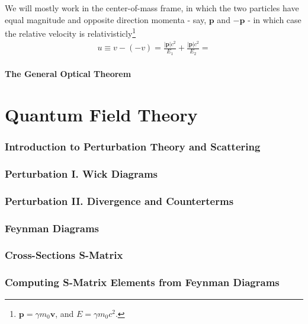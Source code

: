 \documentclass[12pt]{article}
\numberwithin{equation}{section}
\begin{document}
We will mostly work in the center-of-mass frame, in which the two particles have equal magnitude and opposite direction momenta - say, $\mathbf{p}$ and $-\mathbf{p}$ - in which case the relative velocity is relativisticly\footnote{$\mathbf{p} = \gamma m_0\mathbf{v}$, and $E=\gamma m_0c^2$.}
\begin{equation}
    \begin{split}
        u \equiv v-(-v) = \frac{|\mathbf{p}|c^2}{E_1}+\frac{|\mathbf{p}|c^2}{E_2} = 
    \end{split}
\end{equation}

\subsection{The General Optical Theorem}
\part{Quantum Field Theory}
\section{Introduction to Perturbation Theory and Scattering} 
\section{Perturbation I. Wick Diagrams}
\section{Perturbation II. Divergence and Counterterms}
\section{Feynman Diagrams}
\section{Cross-Sections S-Matrix}
\section{Computing S-Matrix Elements from Feynman Diagrams}
\end{document}
